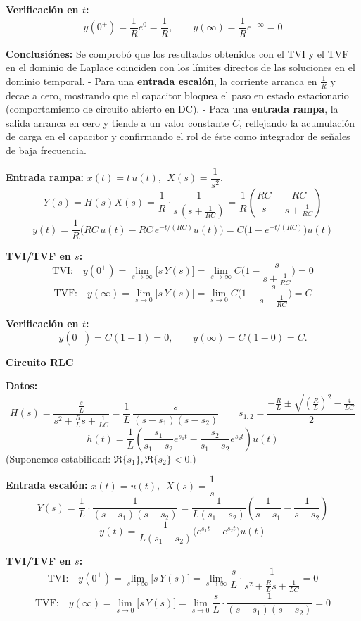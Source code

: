 \textbf{Verificación en \(t\):}
\[
y(0^+)=\frac{1}{R}e^{0}= \frac{1}{R},\qquad
y(\infty)=\frac{1}{R}e^{-\infty}=0
\]

\textbf{Conclusiónes:}  
Se comprobó que los resultados obtenidos con el TVI y el TVF en el dominio de Laplace coinciden con los límites directos de las soluciones en el dominio temporal.  
- Para una \textbf{entrada escalón}, la corriente arranca en $\tfrac{1}{R}$ y decae a cero, mostrando que el capacitor bloquea el paso en estado estacionario (comportamiento de circuito abierto en DC).  
- Para una \textbf{entrada rampa}, la salida arranca en cero y tiende a un valor constante $C$, reflejando la acumulación de carga en el capacitor y confirmando el rol de éste como integrador de señales de baja frecuencia.  

\medskip

\textbf{Entrada rampa:} \(x(t)=t\,u(t)\), \(\;X(s)=\dfrac{1}{s^2}\).
\[
Y(s)=H(s)X(s)=\frac{1}{R}\cdot\frac{1}{s\,(s+\tfrac{1}{RC})}
=\frac{1}{R}\!\left(\frac{RC}{s}-\frac{RC}{s+\tfrac{1}{RC}}\right)
\]
\[
y(t)=\frac{1}{R}\big(RC\,u(t)-RC\,e^{-t/(RC)}u(t)\big)
= C\big(1-e^{-t/(RC)}\big)u(t)
\]

\textbf{TVI/TVF en \(s\):}
\[
\text{TVI:}\quad y(0^+)=\lim_{s\to\infty}\big[s\,Y(s)\big]
=\lim_{s\to\infty} C\Big(1-\frac{s}{s+\tfrac{1}{RC}}\Big)=0
\]
\[
\text{TVF:}\quad y(\infty)=\lim_{s\to 0}\big[s\,Y(s)\big]
=\lim_{s\to 0} C\Big(1-\frac{s}{s+\tfrac{1}{RC}}\Big)=C
\]

\textbf{Verificación en \(t\):}
\[
y(0^+)=C(1-1)=0,\qquad y(\infty)=C(1-0)=C.
\]


\textbf{Circuito RLC}

\textbf{Datos:}
\[
H(s)=\frac{\tfrac{s}{L}}{s^2+\tfrac{R}{L}s+\tfrac{1}{LC}}
=\frac{1}{L}\,\frac{s}{(s-s_1)(s-s_2)}\qquad
s_{1,2}=\frac{-\tfrac{R}{L}\pm\sqrt{\left(\tfrac{R}{L}\right)^2-\tfrac{4}{LC}}}{2}
\]
\[
h(t)=\frac{1}{L}\left(\frac{s_1}{s_1-s_2}e^{s_1 t}
-\frac{s_2}{s_1-s_2}e^{s_2 t}\right)u(t)
\]
(Suponemos estabilidad: \(\Re\{s_1\},\Re\{s_2\}<0\).)

\textbf{Entrada escalón:} \(x(t)=u(t)\), \(\;X(s)=\dfrac{1}{s}\)
\[
Y(s)=\frac{1}{L}\cdot\frac{1}{(s-s_1)(s-s_2)}
=\frac{1}{L(s_1-s_2)}\!\left(\frac{1}{s-s_1}-\frac{1}{s-s_2}\right)
\]
\[
y(t)=\frac{1}{L(s_1-s_2)}\big(e^{s_1 t}-e^{s_2 t}\big)u(t)
\]

\textbf{TVI/TVF en \(s\):}
\[
\text{TVI:}\quad y(0^+)=\lim_{s\to\infty}\big[s\,Y(s)\big]
=\lim_{s\to\infty}\frac{s}{L}\cdot\frac{1}{s^2+\tfrac{R}{L}s+\tfrac{1}{LC}}=0
\]
\[
\text{TVF:}\quad y(\infty)=\lim_{s\to 0}\big[s\,Y(s)\big]
=\lim_{s\to 0}\frac{s}{L}\cdot\frac{1}{(s-s_1)(s-s_2)}=0
\]

